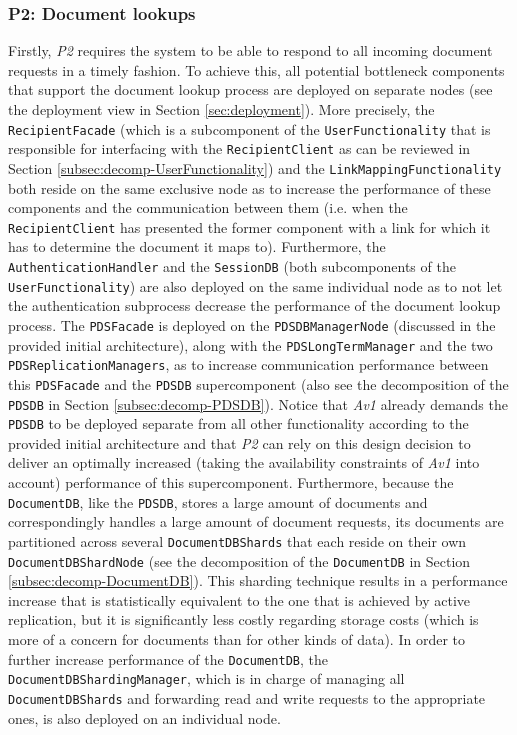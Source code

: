 \documentclass[a4paper,10pt]{article}
\begin{document}
\subsubsection{P2: Document lookups}\label{subsubsec:P2}
Firstly, \textit{P2} requires the system to be able to respond to all incoming document requests in a timely fashion. To achieve this, all potential bottleneck components that support the document lookup process are deployed on separate nodes (see the deployment view in Section \ref{sec:deployment}). More precisely, the \texttt{RecipientFacade} (which is a subcomponent of the \texttt{UserFunctionality} that is responsible for interfacing with the \texttt{RecipientClient} as can be reviewed in Section \ref{subsec:decomp-UserFunctionality}) and the \texttt{LinkMappingFunctionality} both reside on the same exclusive node as to increase the performance of these components and the communication between them (i.e. when the \texttt{RecipientClient} has presented the former component with a link for which it has to determine the document it maps to). Furthermore, the \texttt{AuthenticationHandler} and the \texttt{SessionDB} (both subcomponents of the \texttt{UserFunctionality}) are also deployed on the same individual node as to not let the authentication subprocess decrease the performance of the document lookup process. The \texttt{PDSFacade} is deployed on the \texttt{PDSDBManagerNode} (discussed in the provided initial architecture), along with the \texttt{PDSLongTermManager} and the two \texttt{PDSReplicationManagers}, as to increase communication performance between this \texttt{PDSFacade} and the \texttt{PDSDB} supercomponent (also see the decomposition of the \texttt{PDSDB} in Section \ref{subsec:decomp-PDSDB}). Notice that \textit{Av1} already demands the \texttt{PDSDB} to be deployed separate from all other functionality according to the provided initial architecture and that \textit{P2} can rely on this design decision to deliver an optimally increased (taking the availability constraints of \textit{Av1} into account) performance of this supercomponent. Furthermore, because the \texttt{DocumentDB}, like the \texttt{PDSDB}, stores a large amount of documents and correspondingly handles a large amount of document requests, its documents are partitioned across several \texttt{DocumentDBShards} that each reside on their own \texttt{DocumentDBShardNode} (see the decomposition of the \texttt{DocumentDB} in Section \ref{subsec:decomp-DocumentDB}). This sharding technique results in a performance increase that is statistically equivalent to the one that is achieved by active replication, but it is significantly less costly regarding storage costs (which is more of a concern for documents than for other kinds of data). In order to further increase performance of the \texttt{DocumentDB}, the \texttt{DocumentDBShardingManager}, which is in charge of managing all \texttt{DocumentDBShards} and forwarding read and write requests to the appropriate ones, is also deployed on an individual node.
\end{document}
